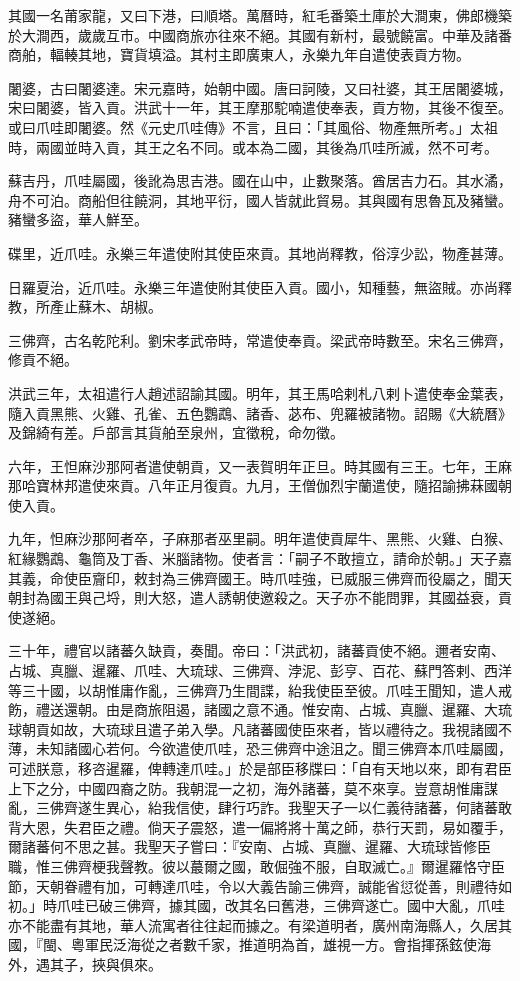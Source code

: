 \begin{pinyinscope}
其國一名莆家龍，又曰下港，曰順塔。萬曆時，紅毛番築土庫於大澗東，佛郎機築於大澗西，歲歲互市。中國商旅亦往來不絕。其國有新村，最號饒富。中華及諸番商舶，輻輳其地，寶貨填溢。其村主即廣東人，永樂九年自遣使表貢方物。

闍婆，古曰闍婆達。宋元嘉時，始朝中國。唐曰訶陵，又曰社婆，其王居闍婆城，宋曰闍婆，皆入貢。洪武十一年，其王摩那駝喃遣使奉表，貢方物，其後不復至。或曰爪哇即闍婆。然《元史爪哇傳》不言，且曰：「其風俗、物產無所考。」太祖時，兩國並時入貢，其王之名不同。或本為二國，其後為爪哇所滅，然不可考。

蘇吉丹，爪哇屬國，後訛為思吉港。國在山中，止數聚落。酋居吉力石。其水潏，舟不可泊。商船但往饒洞，其地平衍，國人皆就此貿易。其與國有思魯瓦及豬蠻。豬蠻多盜，華人鮮至。

碟里，近爪哇。永樂三年遣使附其使臣來貢。其地尚釋教，俗淳少訟，物產甚薄。

日羅夏治，近爪哇。永樂三年遣使附其使臣入貢。國小，知種藝，無盜賊。亦尚釋教，所產止蘇木、胡椒。

三佛齊，古名乾陀利。劉宋孝武帝時，常遣使奉貢。梁武帝時數至。宋名三佛齊，修貢不絕。

洪武三年，太祖遣行人趙述詔諭其國。明年，其王馬哈剌札八剌卜遣使奉金葉表，隨入貢黑熊、火雞、孔雀、五色鸚鵡、諸香、苾布、兜羅被諸物。詔賜《大統曆》及錦綺有差。戶部言其貨舶至泉州，宜徵稅，命勿徵。

六年，王怛麻沙那阿者遣使朝貢，又一表賀明年正旦。時其國有三王。七年，王麻那哈寶林邦遣使來貢。八年正月復貢。九月，王僧伽烈宇蘭遣使，隨招諭拂菻國朝使入貢。

九年，怛麻沙那阿者卒，子麻那者巫里嗣。明年遣使貢犀牛、黑熊、火雞、白猴、紅緣鸚鵡、龜筒及丁香、米腦諸物。使者言：「嗣子不敢擅立，請命於朝。」天子嘉其義，命使臣齎印，敕封為三佛齊國王。時爪哇強，已威服三佛齊而役屬之，聞天朝封為國王與己埒，則大怒，遣人誘朝使邀殺之。天子亦不能問罪，其國益衰，貢使遂絕。

三十年，禮官以諸蕃久缺貢，奏聞。帝曰：「洪武初，諸蕃貢使不絕。邇者安南、占城、真臘、暹羅、爪哇、大琉球、三佛齊、浡泥、彭亨、百花、蘇門答剌、西洋等三十國，以胡惟庸作亂，三佛齊乃生間諜，紿我使臣至彼。爪哇王聞知，遣人戒飭，禮送還朝。由是商旅阻遏，諸國之意不通。惟安南、占城、真臘、暹羅、大琉球朝貢如故，大琉球且遣子弟入學。凡諸蕃國使臣來者，皆以禮待之。我視諸國不薄，未知諸國心若何。今欲遣使爪哇，恐三佛齊中途沮之。聞三佛齊本爪哇屬國，可述朕意，移咨暹羅，俾轉達爪哇。」於是部臣移牒曰：「自有天地以來，即有君臣上下之分，中國四裔之防。我朝混一之初，海外諸蕃，莫不來享。豈意胡惟庸謀亂，三佛齊遂生異心，紿我信使，肆行巧詐。我聖天子一以仁義待諸蕃，何諸蕃敢背大恩，失君臣之禮。倘天子震怒，遣一偏將將十萬之師，恭行天罰，易如覆手，爾諸蕃何不思之甚。我聖天子嘗曰：『安南、占城、真臘、暹羅、大琉球皆修臣職，惟三佛齊梗我聲教。彼以蕞爾之國，敢倔強不服，自取滅亡。』爾暹羅恪守臣節，天朝眷禮有加，可轉達爪哇，令以大義告諭三佛齊，誠能省愆從善，則禮待如初。」時爪哇已破三佛齊，據其國，改其名曰舊港，三佛齊遂亡。國中大亂，爪哇亦不能盡有其地，華人流寓者往往起而據之。有梁道明者，廣州南海縣人，久居其國，『閩、粵軍民泛海從之者數千家，推道明為首，雄視一方。會指揮孫鉉使海外，遇其子，挾與俱來。


\end{pinyinscope}
